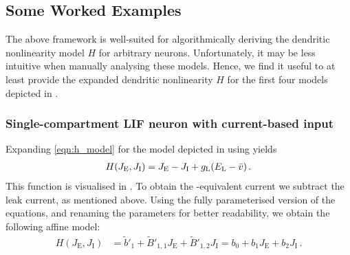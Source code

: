 \subsection{Some Worked Examples}
\label{sec:nlif_examples}

The above framework is well-suited for algorithmically deriving the dendritic nonlinearity model $H$ for arbitrary \nlif neurons.
Unfortunately, it may be less intuitive when manually analysing these models.
Hence, we find it useful to at least provide the expanded dendritic nonlinearity $H$ for the first four models depicted in .

\subsubsection{Single-compartment LIF neuron with current-based input}
Expanding \cref{eqn:h_model} for the model depicted in  using  yields 
\begin{align*}
	H(J_\mathrm{E}, J_\mathrm{I}) = J_\mathrm{E} - J_\mathrm{I} + g_\mathrm{L}(E_\mathrm{L} - {{\bar v}}) \,.
\end{align*}
This function is visualised in . To obtain the \LIF-equivalent current we subtract the leak current, as mentioned above.
Using the fully parameterised version of the equations, and renaming the parameters for better readability, we obtain the following affine model:
\begin{align*}
	H(J_\mathrm{E}, J_\mathrm{I}) &= \tilde b'_1 + \tilde B'_{1, 1} J_\mathrm{E} + \tilde B'_{1, 2} J_\mathrm{I} = b_0 + b_1 J_\mathrm{E} + b_2 J_\mathrm{I} \,.
\end{align*}

